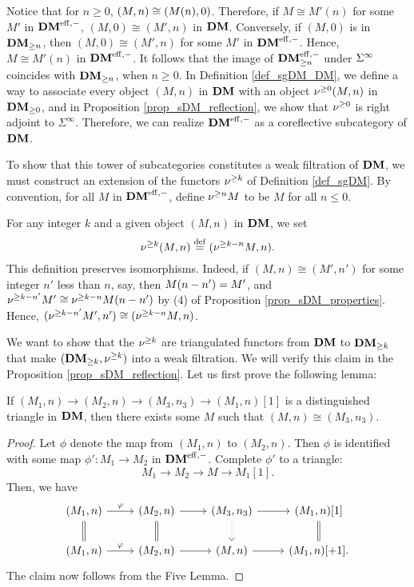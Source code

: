 Notice that for $n \geq 0$, $(M, n) \cong (\tZ[n]{M}, 0)$. 
Therefore, if $M \cong M'(n)$ for some $M'$ in $\DMeff$, $(M, 0) 
\cong (M', n)$ in $\DM$. Conversely, if $(M, 0)$ is in 
$\GFiltDM[n]{\DM}$, then $(M, 0) \cong (M', n)$ for some $M'$ in
$\DMeff$. Hence, $M \cong M'(n)$ in $\DMeff$. It follows that the 
image of $\GFiltDM[n]{\DMeff}$ under $\spectDM$ coincides with 
$\GFiltDM[n]{\DM}$, when $n \geq 0$. In Definition 
\ref{def_sgDM_DM}, we define a way to associate every object
$(M, n)$ in $\DM$ with an object $\sgDM{0}(M, n)$ in 
$\GFiltDM[0]{\DM}$, and in Proposition \ref{prop_sDM_reflection},
we show that $\sgDM{0}$ is right adjoint to $\Sigma^\infty$.
Therefore, we can realize $\DMeff$ as a coreflective subcategory
of $\DM$.

To show that this tower of subcategories constitutes a weak 
filtration of $\DM$, we must construct an extension of the 
functors $\sgDM{k}$ of Definition \ref{def_sgDM}.  By convention, 
for all $M$ in $\DMeff$, define $\sgDM{n} M$ to be $M$ for all $n 
\leq 0$. 

\begin{defn}\label{def_sgDM_DM}
For any integer $k$ and a given object $(M, n)$ in $\DM$, we 
set
\[
\sgDM{k}(M, n) \defeq (\sgDM{k - n}M, n).
\]
This definition preserves isomorphisms. Indeed, if
$(M, n) \cong (M', n')$ for some integer $n'$ less than $n$, say, 
then $\tZ[n - n']{M} = M'$, and $\sgDM{k - n'}M' \cong 
\LHI[n - n']{\sgDM{k - n}M}$ by (4) of Proposition 
\ref{prop_sDM_properties}. Hence, $(\sgDM{k - n'}M', n') \cong 
(\sgDM{k - n}M, n)$. 
\end{defn}

We want to show that the $\sgDM{k}$ are triangulated functors from 
$\DM$ to $\GFiltDM[k]{\DM}$ that make $(\GFiltDM[k]{\DM}, 
\sgDM{k})$ into a weak filtration. We will verify this claim in 
the Proposition \ref{prop_sDM_reflection}. Let us first prove the 
following lemma:

\begin{lem}\label{lem_triangle_in_DM}
If $(M_1, n) \to (M_2, n) \to (M_3, n_3) \to (M_1, n)[1]$
is a distinguished triangle in $\DM$, then there exists some $M$ 
such that $(M, n) \cong (M_3, n_3)$.
\end{lem}
\begin{proof}
Let $\phi$ denote the map from $(M_1, n)$ to $(M_2, n)$. Then
$\phi$ is identified with some map $\phi': M_1 \to M_2$ in 
$\DMeff$. Complete $\phi'$ to a triangle:
\[
M_1 \to M_2 \to M \to M_1[1].
\]
Then, we have
\[
\begin{tikzcd}
(M_1, n) \arrow{r}{\phi} \arrow[equals]{d} &
(M_2, n) \arrow{r} \arrow[equals]{d} &
(M_3, n_3) \arrow{r} \arrow[dotted]{d} &
(M_1, n)[1] \arrow[equals]{d}\\
(M_1, n) \arrow{r}{\phi} &
(M_2, n) \arrow{r} &
(M, n) \arrow{r} &
(M_1, n)[+1].
\end{tikzcd}
\]
The claim now follows from the Five Lemma.
\end{proof}

